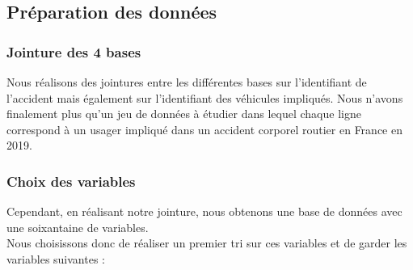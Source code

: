 \documentclass[french,]{tp}
\begin{document}
\hypertarget{pruxe9paration-des-donnuxe9es}{%
\subsection{Préparation des données}\label{pruxe9paration-des-donnuxe9es}}

\hypertarget{jointure-des-4-bases}{%
\subsubsection{Jointure des 4 bases}\label{jointure-des-4-bases}}

Nous réalisons des jointures entre les différentes bases sur l'identifiant de l'accident mais également sur l'identifiant des véhicules impliqués. Nous n'avons finalement plus qu'un jeu de données à étudier dans lequel chaque ligne correspond à un usager impliqué dans un accident corporel routier en France en 2019.

\hypertarget{choix-des-variables}{%
\subsubsection{Choix des variables}\label{choix-des-variables}}

Cependant, en réalisant notre jointure, nous obtenons une base de données avec une soixantaine de variables.\\
Nous choisissons donc de réaliser un premier tri sur ces variables et de garder les variables suivantes :
\end{document}
